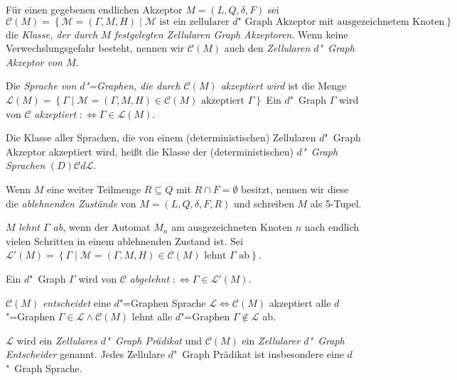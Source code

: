 \documentclass[11pt]{article}
\newcommand{\defWord}[1]{\emph{#1}}
\begin{document}
\begin{definition}[Sprachen]
	Für einen gegebenen endlichen Akzeptor $M = \left(L, Q, \delta, F\right)$ sei $\mathcal{C} \left(M\right) = \left\{\mathcal{M} = \left(\Gamma, M, H\right) \mid \mathcal{M} \text{ ist ein zellularer $d$"~Graph Akzeptor mit ausgezeichnetem Knoten} \right\}$  die \defWord{Klasse, der durch $M$ festgelegten Zellularen Graph Akzeptoren}. 
	Wenn keine Verwechslungsgefahr besteht, nennen wir $\mathcal{C}\left(M\right)$ auch den \defWord{Zellularen $d$"~Graph Akzeptor von $M$}.
	
	Die \defWord{Sprache von $d$"=Graphen, die durch $\mathcal{C}\left(M\right)$ akzeptiert wird} ist die Menge $\mathcal{L}\left(M\right) = \left\{\Gamma \mid \mathcal{M} = \left(\Gamma, M, H\right) \in \mathcal{C}\left(M\right) \text{ akzeptiert } \Gamma \right\}$
	Ein $d$"~Graph $\Gamma$ wird von $\mathcal{C}$ \defWord{akzeptiert} $:\iff \Gamma \in \mathcal{L}\left(M\right)$.
	
	Die Klasse aller Sprachen, die von einem (deterministischen) Zellularen $d$"~Graph Akzeptor akzeptiert wird, heißt die Klasse der (deterministischen) \defWord{$d$"~Graph Sprachen} $(D)\mathcal{C}d\mathcal{L}$. 
\end{definition}

\begin{definition}
	Wenn $M$ eine weiter Teilmenge $R \subseteq Q$ mit $R \cap F = \emptyset$ besitzt, nennen wir diese die \defWord{ablehnenden Zustände} von $M = \left(L, Q, \delta, F, R\right)$ und schreiben $M$ als 5-Tupel.
	
	$M$ \defWord{lehnt $\Gamma$ ab}, wenn der Automat $M_n$ am ausgezeichneten Knoten $n$ nach endlich vielen Schritten in einem ablehnenden Zustand ist.
	Sei  $\mathcal{L}'\left(M\right) = \left\{\Gamma \mid \mathcal{M} = \left(\Gamma, M, H\right) \in \mathcal{C}\left(M\right) \text{ lehnt } \Gamma \text{ ab}\right\}$.
	
	Ein $d$"~Graph $\Gamma$ wird von $\mathcal{C}$ \defWord{abgelehnt} $:\iff \Gamma \in \mathcal{L}'\left(M\right)$.
	
	$\mathcal{C}\left(M\right)$ \defWord{entscheidet} eine $d$"=Graphen Sprache $\mathcal{L} \iff \mathcal{C}\left(M\right)$ akzeptiert alle $d$"=Graphen $\Gamma \in \mathcal{L} \land \mathcal{C}\left(M\right)$ lehnt alle $d$"=Graphen $\Gamma \notin \mathcal{L}$ ab.
	
	$\mathcal{L}$ wird ein \defWord{Zellulares $d$"~Graph Prädikat} und $\mathcal{C}\left(M\right)$ ein \defWord{Zellularer $d$"~Graph Entscheider} genannt. 
	Jedes Zellulare $d$"~Graph Prädikat ist insbesondere eine $d$"~Graph Sprache.
\end{definition}
\end{document}
